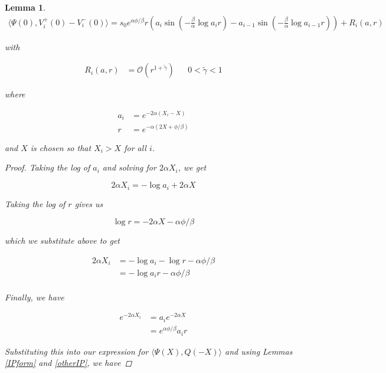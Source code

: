 \documentclass[12pt]{article}
\newtheorem{lemma}{Lemma}
\begin{document}
\begin{lemma}

\begin{align*}
\langle \Psi(0), V_i^+(0) - V_i^-(0) \rangle = 
s_0 e^{\alpha \phi / \beta } r \left( a_i \sin \left( - \frac{\beta}{\alpha} \log a_i r \right) - a_{i-1} \sin \left( - \frac{\beta}{\alpha} \log a_{i-1} r \right) \right) + R_i(a, r)
\end{align*}

with 

\begin{align*}
R_i(a, r) &= \mathcal{O}(r^{1 + \tilde{\gamma}}) && 0 < \tilde{\gamma} < 1
\end{align*}

where 

\begin{align*}
a_i &= e^{-2 \alpha (X_i - X)} \\
r &= e^{-\alpha( 2X + \phi / \beta ) }
\end{align*}

and $X$ is chosen so that $X_i > X$ for all $i$.

\begin{proof}

Taking the log of $a_i$ and solving for $2 \alpha X_i$, we get

\[
2 \alpha X_i = -\log a_i + 2 \alpha X
\]

Taking the log of $r$ gives us

\[
\log r = -2 \alpha X - \alpha \phi / \beta
\]

which we substitute above to get

\begin{align*}
2 \alpha X_i &= -\log a_i - \log r - \alpha \phi / \beta \\
&= -\log a_i r - \alpha \phi / \beta \\
\end{align*}

Finally, we have

\begin{align*}
e^{-2 \alpha X_i} &= a_i e^{-2 \alpha X} \\
&= e^{\alpha \phi / \beta } a_i r
\end{align*}

Substituting this into our expression for $\langle \Psi(X), Q(-X) \rangle$ and using Lemmas \ref{IPform} and \ref{otherIP}, we have


\end{proof}
\end{lemma}
\end{document}
